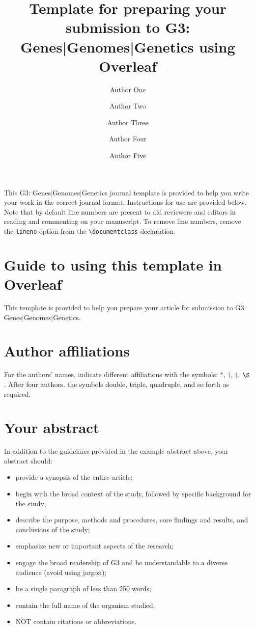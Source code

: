 \documentclass[9pt,twocolumn,twoside,lineno]{gsag3jnl}
\title{Template for preparing your submission to G3: Genes|Genomes|Genetics using Overleaf}
\author[$\ast$,1]{Author One}
\author[2]{Author Two}
\author[3]{Author Three}
\author[4]{Author Four}
\author[5]{Author Five}
\affil[1]{Author one affiliation}
\affil[2]{Author two affiliation}
\affil[3]{Author three affiliation}
\affil[4]{Author four affiliation}
\affil[5]{Author five affiliation}
\begin{document}
\maketitle
\thispagestyle{firststyle}
\firstpagefootnote
\vspace{-13pt}%

\noindent This G3: Genes|Genomes|Genetics journal template is provided to help you write your work in the correct journal format. Instructions for use are provided below. Note that by default line numbers are present to aid reviewers and editors in reading and commenting on your manuscript. To remove line numbers, remove the \texttt{lineno} option from the \verb|\documentclass| declaration.

\section{Guide to using this template in Overleaf}

This template is provided to help you prepare your article for submission to G3: Genes|Genomes|Genetics.

\section{Author affiliations}

For the authors' names, indicate different affiliations with the symbols: $\ast$, $\dagger$, $\ddagger$, $\S$. After four authors, the symbols double, triple, quadruple, and so forth as required.

\section{Your abstract}

In addition to the guidelines provided in the example abstract above, your abstract should:

\begin{itemize}
\item provide a synopsis of the entire article;
\item begin with the broad context of the study, followed by specific background for the study;
\item describe the purpose, methods and procedures, core findings and results, and conclusions of the study;
\item emphasize new or important aspects of the research;
\item engage the broad readership of G3 and be understandable to a diverse audience (avoid using jargon);
\item be a single paragraph of less than 250 words;
\item contain the full name of the organism studied;
\item NOT contain citations or abbreviations.
\end{itemize}
\end{document}
